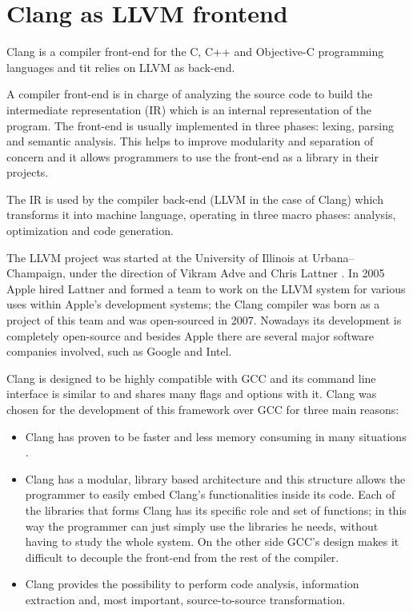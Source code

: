 \documentclass[a4paper,11pt,oneside]{book}
\begin{document}
\section{Clang as LLVM frontend}

Clang \cite{clang} is a compiler front-end for the C, C++ and Objective-C programming languages and tit relies on LLVM as back-end. 

A compiler front-end is in charge of analyzing the source code to build the intermediate representation (IR) which is an internal representation of the program. The front-end is usually implemented in three phases: lexing, parsing and semantic analysis. This helps to improve modularity and separation of concern and it allows programmers to use the front-end as a library in their projects. 

The IR is used by the compiler back-end (LLVM in the case of Clang) which transforms it into machine language, operating in three macro phases: analysis, optimization and code generation. 

The LLVM project was started at the University of Illinois at Urbana–Champaign, under the direction of Vikram Adve and Chris Lattner \cite{llvm1} \cite{llvm2}. In 2005 Apple hired Lattner and formed a team to work on the LLVM system for various uses within Apple's development systems; the Clang compiler was born as a project of this team and was open-sourced in 2007. Nowadays its development is completely open-source and besides Apple there are several major software companies involved, such as Google and Intel.

Clang is designed to be highly compatible with GCC and its command line interface is similar to and shares many flags and options with it. Clang was chosen for the development of this framework over GCC for three main reasons:
\begin{itemize}
 \item Clang has proven to be faster and less memory consuming in many situations \cite{clanggcc}. 
 \item Clang has a modular, library based architecture and this structure allows the programmer to easily embed Clang’s functionalities inside its code. Each of the libraries that forms Clang has its specific role and set of functions; in this way the programmer can just simply use the libraries he needs, without having to study the whole system. On the other side GCC's design makes it difficult to decouple the front-end from the rest of the compiler.
 \item Clang provides the possibility to perform code analysis, information extraction and, most important, source-to-source transformation.
\end{itemize}
\end{document}
